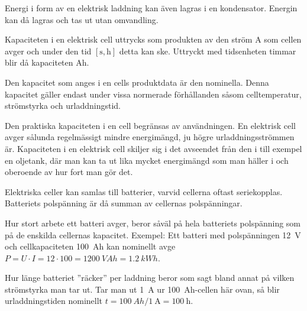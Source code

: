 Energi i form av en elektrisk laddning kan även lagras i en kondensator.
Energin kan då lagras och tas ut utan omvandling.

Kapaciteten i en elektrisk cell uttrycks som produkten av den ström \si{\ampere}
som cellen avger och under den tid \(\mathrm{[s, h]}\) detta kan ske.
Uttryckt med tidsenheten timmar blir då kapaciteten \si{Ah}.

Den kapacitet som anges i en cells produktdata är den nominella.
Denna kapacitet gäller endast under vissa normerade förhållanden såsom
celltemperatur, strömstyrka och urladdningstid.

Den praktiska kapaciteten i en cell begränsas av användningen.
En elektrisk cell avger sålunda regelmässigt mindre energimängd, ju högre
urladdningsströmmen är.
Kapaciteten i en elektrisk cell skiljer sig i det avseendet från den i
till exempel en oljetank, där man kan ta ut lika mycket energimängd som man häller i
och oberoende av hur fort man gör det.

Elektriska celler kan samlas till batterier, varvid cellerna oftast
seriekopplas.
Batteriets polspänning är då summan av cellernas pols\-pänningar.

Hur stort arbete ett batteri avger, beror såväl på hela batteriets
polspänning som på de enskilda cellernas kapacitet.
Exempel:
Ett batteri med polspänningen \SI{12}{\volt} och cellkapaciteten
\SI{100}{Ah} kan nominellt avge
\(P = U \cdot I = 12 \cdot 100 = \SI{1200}{VAh} = \SI{1,2}{kWh}\).

Hur länge batteriet ''räcker'' per laddning beror som sagt bland annat på
vilken strömstyrka man tar ut.
Tar man ut \SI{1}{\ampere} ur \SI{100}{Ah}-cellen här ovan, så blir
urladdningstiden nominellt \(t = \SI{100}{Ah}/\SI{1}{\ampere} =
\SI{100}{\hour}\).
